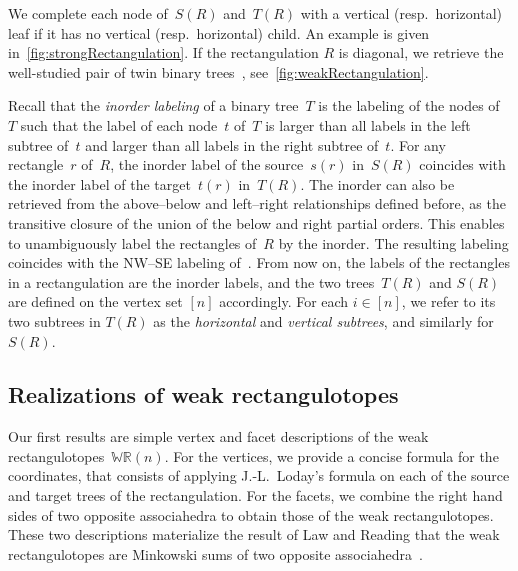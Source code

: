 \documentclass{amsart}
\theoremstyle{definition}
\newcommand{\darkblue}{\color{darkblue}} %
\newcommand{\defn}[1]{\textsl{\darkblue #1}} %
\newcommand{\polytope}[1]{\mathds{#1}} %
\newcommand{\WRP}{\polytope{WR}} %
\begin{document}

We complete each node of~$S(R)$ and~$T(R)$ with a vertical (resp.~horizontal) leaf if it has no vertical (resp.~horizontal) child.
An example is given in~\cref{fig:strongRectangulation}.
If the rectangulation $R$ is diagonal, we retrieve the well-studied pair of twin binary trees~\cite{MR1417289,MR2914637}, see~\cref{fig:weakRectangulation}.

Recall that the \defn{inorder labeling} of a binary tree~$T$ is the labeling of the nodes of~$T$ such that the label of each node~$t$ of~$T$ is larger than all labels in the left subtree of~$t$ and larger than all labels in the right subtree of~$t$.
For any rectangle~$r$ of~$R$, the inorder label of the source~$s(r)$ in~$S(R)$ coincides with the inorder label of the target~$t(r)$ in~$T(R)$.
The inorder can also be retrieved from the above--below and left--right relationships defined before, as the transitive closure of the union of the below and right partial orders.
This enables to unambiguously label the rectangles of~$R$ by the inorder.
The resulting labeling coincides with the NW--SE labeling of~\cite{ACFF24}.
From now on, the labels of the rectangles in a rectangulation are the inorder labels, and the two trees~$T(R)$ and $S(R)$ are defined on the vertex set $[n]$ accordingly.
For each $i\in [n]$, we refer to its two subtrees in $T(R)$ as the \defn{horizontal} and \defn{vertical subtrees}, and similarly for $S(R)$.


\subsection{Realizations of weak rectangulotopes}
\label{subsec:weakRectangulotopes}

Our first results are simple vertex and facet descriptions of the weak rectangulotopes~$\WRP(n)$.
For the vertices, we provide a concise formula for the coordinates, that consists of applying J.-L.~Loday's formula on each of the source and target trees of the rectangulation.
For the facets, we combine the right hand sides of two opposite associahedra to obtain those of the weak rectangulotopes.
These two descriptions materialize the result of Law and Reading that the weak rectangulotopes are Minkowski sums of two opposite associahedra~\cite{MR2871762}.
\end{document}
